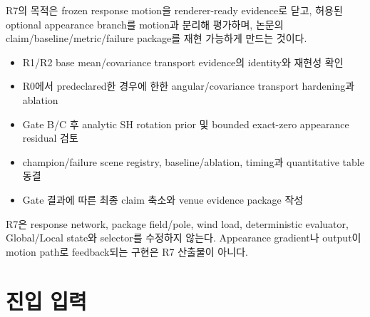 \documentclass[10pt]{article}
\begin{document}
R7의 목적은 frozen response motion을 renderer-ready evidence로 닫고, 허용된 optional appearance branch를
motion과 분리해 평가하며, 논문의 claim/baseline/metric/failure package를 재현 가능하게 만드는 것이다.

\begin{itemize}
  \item R1/R2 base mean/covariance transport evidence의 identity와 재현성 확인
  \item R0에서 predeclared한 경우에 한한 angular/covariance transport hardening과 ablation
  \item Gate B/C 후 analytic SH rotation prior 및 bounded exact-zero appearance residual 검토
  \item champion/failure scene registry, baseline/ablation, timing과 quantitative table 동결
  \item Gate 결과에 따른 최종 claim 축소와 venue evidence package 작성
\end{itemize}

R7은 response network, package field/pole, wind load, deterministic evaluator, Global/Local state와 selector를
수정하지 않는다. Appearance gradient나 output이 motion path로 feedback되는 구현은 R7 산출물이 아니다.

\section{진입 입력}
\label{sec:r7-chapter-2}
\end{document}
